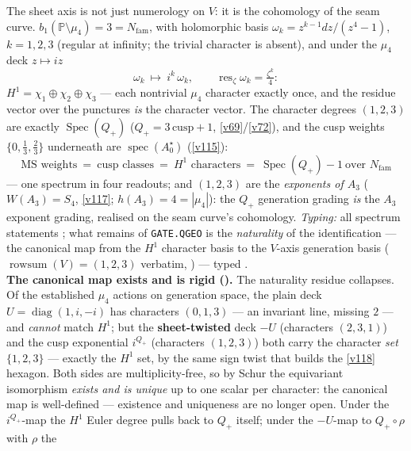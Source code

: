 \documentclass[11pt,a4paper]{article}
\newcommand{\Nfam}{N_{\mathrm{fam}}}
\newcommand{\PP}{\mathbb{P}}
\theoremstyle{definition}
\begin{document}
\begin{keybox}
The sheet axis is not just numerology on $V$: it is the cohomology of the seam curve.
$b_1(\PP\setminus\mu_4)=3=\Nfam$, with holomorphic basis $\omega_k=z^{k-1}dz/(z^4-1)$, $k=1,2,3$
(regular at infinity; the trivial character is absent), and under the $\mu_4$ deck $z\mapsto iz$
\[
  \omega_k\ \longmapsto\ i^k\,\omega_k,\qquad
  \operatorname{res}_{\zeta}\omega_k=\tfrac{\zeta^k}4 :
\]
$H^1=\chi_1\oplus\chi_2\oplus\chi_3$ --- each nontrivial $\mu_4$ character exactly once, and the residue
vector over the punctures \emph{is} the character vector. The character degrees $(1,2,3)$ are exactly
$\operatorname{Spec}(Q_+)$ ($Q_+=3\,\mathrm{cusp}+1$, \vref{v69}/\vref{v72}), and the cusp weights $\{0,\tfrac13,
\tfrac23\}$ underneath are $\operatorname{spec}(A_0^\star)$ (\vref{v115}):
\[
  \boxed{\ \text{MS weights}\ =\ \text{cusp classes}\ =\ H^1\text{ characters}\ =\
  \operatorname{Spec}(Q_+)-1\ \text{over } \Nfam\ }
\]
--- one spectrum in four readouts; and $(1,2,3)$ are the \emph{exponents of $A_3$} ($W(A_3)=S_4$, \vref{v117};
$h(A_3)=4=|\mu_4|$): the $Q_+$ generation grading \emph{is} the $A_3$ exponent grading, realised on the
seam curve's cohomology. \emph{Typing:} all spectrum statements \mE; what remains of \texttt{GATE.QGEO}
is the \emph{naturality} of the identification --- the canonical map from the $H^1$ character basis to
the $V$-axis generation basis ($\operatorname{rowsum}(V)=(1,2,3)$ verbatim, )
--- typed \mC.
\smallskip\\
\noindent\textbf{The canonical map exists and is rigid ().} The naturality
residue collapses. Of the established $\mu_4$ actions on generation space, the plain deck
$U=\operatorname{diag}(1,i,-i)$ has characters $(0,1,3)$ --- an invariant line, missing $2$ --- and
\emph{cannot} match $H^1$; but the \textbf{sheet-twisted} deck $-U$ (characters $(2,3,1)$) and the cusp
exponential $i^{Q_+}$ (characters $(1,2,3)$) both carry the character \emph{set} $\{1,2,3\}$ --- exactly
the $H^1$ set, by the same sign twist that builds the \vref{v118} hexagon. Both sides are multiplicity-free, so
by Schur the equivariant isomorphism \emph{exists and is unique} up to one scalar per character: the
canonical map is well-defined --- existence and uniqueness are no longer open. Under the $i^{Q_+}$-map
the $H^1$ Euler degree pulls back to $Q_+$ itself; under the $-U$-map to $Q_+\!\circ\rho$ with $\rho$ the

\end{keybox}
\end{document}
